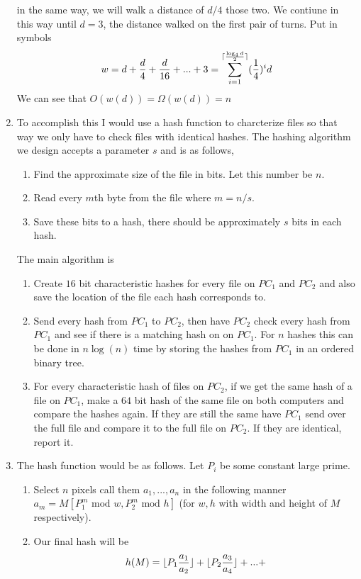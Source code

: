 \documentclass[11pt]{article}
\DeclarePairedDelimiter\ceil{\lceil}{\rceil}
\DeclarePairedDelimiter\floor{\lfloor}{\rfloor}
\begin{document}
\begin{enumerate}
	in the same way, we will walk a distance of $d/4$ those two.
	We contiune in this way until $d = 3$, the distance walked on the first
	pair of turns. Put in symbols
	$$w = d+\frac{d}{4}+\frac{d}{16}+ ... + 3 =
	\sum_{i=1}^{\ceil{\frac{\log_4d}{2}}}(\frac{1}{4})^id $$
	We can see that $O(w(d)) = \Omega(w(d)) = n $
\item 
	To accomplish this I would use a hash function to charcterize files so
	that way we only have to check files with identical hashes. The hashing algorithm we design accepts a parameter $s$
	and is as follows,
	\begin{enumerate}
	\item Find the approximate size of the file in bits. Let this number be $n$.
	\item Read every $m$th byte from the file where $m = n/s$.
	\item Save these bits to a hash, there should be approximately $s$ 
		bits in each hash.
	\end{enumerate}
	The main algorithm is
	\begin{enumerate}
	\item Create $16$ bit characteristic hashes for every file on $PC_1$ and
		$PC_2$ and also save the location of the file each hash
		corresponds to. 
	\item Send every hash from $PC_1$ to $PC_2$, then have $PC_2$ check every
		hash from $PC_1$ and see if there is a matching hash on
		on $PC_1$. For $n$ hashes this can be done in $n\log(n)$ time by
		storing the hashes from $PC_1$ in an ordered binary tree.
	\item For every characteristic hash of files on $PC_2$, if we get the
		same hash of a file on $PC_1$, make a $64$ bit hash of the same
		file on both computers and compare the hashes again. If they
		are still the same have $PC_1$ send over the full file and
		compare it to the full file on $PC_2$. If they are
		identical, report it.
	\end{enumerate}
	\item The hash function would be as follows. Let $P_i$ 
		be some constant large prime. 
	\begin{enumerate}
		\item Select $n$ pixels call them $a_1,...,a_n$  in the following manner
			$a_m = M[P_1^m \text{ mod } w,P_2^m \text{ mod }h] $ (for $w,h$ with
			width and height of $M$ respectively).
		\item Our final hash will be
			$$ h(M) =  \floor{P_1\frac{a_1}{a_2}} + \floor{P_2\frac{a_3}{a_4}} + ...+
$$
\end{enumerate}
\end{enumerate}
\end{document}
